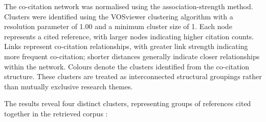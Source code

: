 \documentclass[]{interact}
\theoremstyle{plain}%
\theoremstyle{definition}
\theoremstyle{remark}
\DeclareRobustCommand{\DIFadd}[1]{{\protect\color{DIFaddcolor}\uwave{#1}}}
\DeclareRobustCommand{\DIFdel}[1]{{\protect\color{DIFdelcolor}\sout{#1}}}
\def\DIFadd#1{#1}%
\def\DIFdel#1{}%
\begin{document}
\DIFadd{The} \DIFadd{co-citation} \DIFadd{network} \DIFadd{was} \DIFadd{normalised} \DIFadd{using} \DIFadd{the} \DIFadd{association-strength} \DIFadd{method}\DIFadd{.} \DIFadd{Clusters} \DIFadd{were} \DIFadd{identified} \DIFadd{using} \DIFadd{the} \DIFadd{VOSviewer} \DIFadd{clustering} \DIFadd{algorithm} \DIFadd{with} \DIFadd{a} \DIFadd{resolution} \DIFadd{parameter} \DIFadd{of} \DIFadd{1}\DIFadd{.}\DIFadd{00} \DIFadd{and} \DIFadd{a} \DIFadd{minimum} \DIFadd{cluster} \DIFadd{size} \DIFadd{of} \DIFadd{1}\DIFadd{.} \DIFadd{Each} \DIFadd{node} \DIFadd{represents} \DIFadd{a} \DIFadd{cited} \DIFadd{reference}\DIFadd{,} \DIFadd{with} \DIFadd{larger} \DIFadd{nodes} \DIFadd{indicating} \DIFadd{higher} \DIFadd{citation} \DIFadd{counts}\DIFadd{.} \DIFadd{Links} \DIFadd{represent} \DIFadd{co-citation} \DIFadd{relationships}\DIFadd{,} \DIFadd{with} \DIFadd{greater} \DIFadd{link} \DIFadd{strength} \DIFadd{indicating} \DIFadd{more} \DIFadd{frequent} \DIFadd{co-citation}\DIFadd{;} \DIFadd{shorter} \DIFadd{distances} \DIFadd{generally} \DIFadd{indicate} \DIFadd{closer} \DIFadd{relationships} \DIFadd{within} \DIFadd{the} \DIFadd{network}\DIFadd{.} \DIFadd{Colours} \DIFadd{denote} \DIFadd{the} \DIFadd{clusters} \DIFadd{identified} \DIFadd{from} \DIFadd{the} \DIFadd{co-citation} \DIFadd{structure}\DIFadd{.} \DIFadd{These} \DIFadd{clusters} \DIFadd{are} \DIFadd{treated} \DIFadd{as} \DIFadd{interconnected} \DIFadd{structural} \DIFadd{groupings} \DIFadd{rather} \DIFadd{than} \DIFadd{mutually} \DIFadd{exclusive} \DIFadd{research} \DIFadd{themes}.

The results reveal four distinct clusters, representing \DIFadd{groups} \DIFadd{of} \DIFadd{references} \DIFadd{cited} \DIFadd{together} \DIFadd{in} the \DIFdel{knowledge} \DIFdel{lineage} \DIFdel{of} \DIFdel{deep} \DIFdel{learning-based} \DIFdel{LULC} \DIFdel{research} \DIFadd{retrieved} \DIFadd{corpus} \citep{19}:
\end{document}
